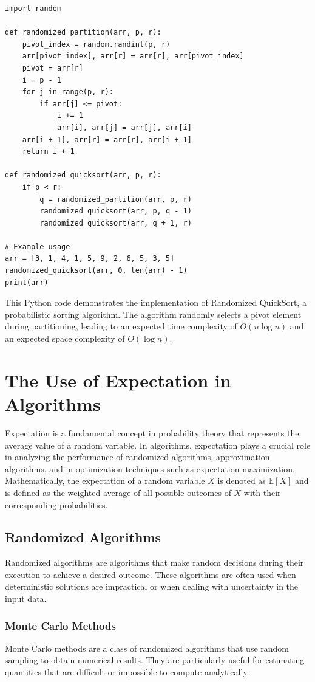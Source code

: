 \documentclass[12pt]{book} %
\begin{document}
\FloatBarrier
\begin{lstlisting}
import random

def randomized_partition(arr, p, r):
    pivot_index = random.randint(p, r)
    arr[pivot_index], arr[r] = arr[r], arr[pivot_index]
    pivot = arr[r]
    i = p - 1
    for j in range(p, r):
        if arr[j] <= pivot:
            i += 1
            arr[i], arr[j] = arr[j], arr[i]
    arr[i + 1], arr[r] = arr[r], arr[i + 1]
    return i + 1

def randomized_quicksort(arr, p, r):
    if p < r:
        q = randomized_partition(arr, p, r)
        randomized_quicksort(arr, p, q - 1)
        randomized_quicksort(arr, q + 1, r)

# Example usage
arr = [3, 1, 4, 1, 5, 9, 2, 6, 5, 3, 5]
randomized_quicksort(arr, 0, len(arr) - 1)
print(arr)
\end{lstlisting}
\FloatBarrier

This Python code demonstrates the implementation of Randomized QuickSort, a probabilistic sorting algorithm. The algorithm randomly selects a pivot element during partitioning, leading to an expected time complexity of \(O(n \log n)\) and an expected space complexity of \(O(\log n)\).


\section{The Use of Expectation in Algorithms}
Expectation is a fundamental concept in probability theory that represents the average value of a random variable. In algorithms, expectation plays a crucial role in analyzing the performance of randomized algorithms, approximation algorithms, and in optimization techniques such as expectation maximization. Mathematically, the expectation of a random variable \(X\) is denoted as \(\mathbb{E}[X]\) and is defined as the weighted average of all possible outcomes of \(X\) with their corresponding probabilities.

\subsection{Randomized Algorithms}
Randomized algorithms are algorithms that make random decisions during their execution to achieve a desired outcome. These algorithms are often used when deterministic solutions are impractical or when dealing with uncertainty in the input data.

\subsubsection{Monte Carlo Methods}
Monte Carlo methods are a class of randomized algorithms that use random sampling to obtain numerical results. They are particularly useful for estimating quantities that are difficult or impossible to compute analytically.
\end{document}
